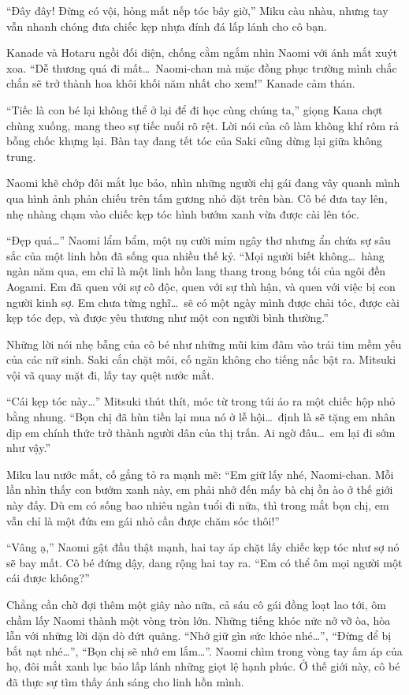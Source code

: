 \documentclass[../main.tex]{subfiles}
\begin{document}
``Đây đây! Đừng có vội, hỏng mất nếp tóc bây giờ,'' Miku càu nhàu, nhưng tay vẫn nhanh chóng đưa chiếc kẹp nhựa đính đá lấp lánh cho cô bạn.

Kanade và Hotaru ngồi đối diện, chống cằm ngắm nhìn Naomi với ánh mắt xuýt xoa. ``Dễ thương quá đi mất\dots\ Naomi-chan mà mặc đồng phục trường mình chắc chắn sẽ trở thành hoa khôi khối năm nhất cho xem!'' Kanade cảm thán.

``Tiếc là con bé lại không thể ở lại để đi học cùng chúng ta,'' giọng Kana chợt chùng xuống, mang theo sự tiếc nuối rõ rệt. Lời nói của cô làm không khí rôm rả bỗng chốc khựng lại. Bàn tay đang tết tóc của Saki cũng dừng lại giữa không trung.

Naomi khẽ chớp đôi mắt lục bảo, nhìn những người chị gái đang vây quanh mình qua hình ảnh phản chiếu trên tấm gương nhỏ đặt trên bàn. Cô bé đưa tay lên, nhẹ nhàng chạm vào chiếc kẹp tóc hình bướm xanh vừa được cài lên tóc.

``Đẹp quá\dots'' Naomi lẩm bẩm, một nụ cười mỉm ngây thơ nhưng ẩn chứa sự sâu sắc của một linh hồn đã sống qua nhiều thế kỷ. ``Mọi người biết không\dots\ hàng ngàn năm qua, em chỉ là một linh hồn lang thang trong bóng tối của ngôi đền Aogami. Em đã quen với sự cô độc, quen với sự thù hận, và quen với việc bị con người kinh sợ. Em chưa từng nghĩ\dots\ sẽ có một ngày mình được chải tóc, được cài kẹp tóc đẹp, và được yêu thương như một con người bình thường.''

Những lời nói nhẹ bẫng của cô bé như những mũi kim đâm vào trái tim mềm yếu của các nữ sinh. Saki cắn chặt môi, cố ngăn không cho tiếng nấc bật ra. Mitsuki vội vã quay mặt đi, lấy tay quệt nước mắt.

``Cái kẹp tóc này\dots'' Mitsuki thút thít, móc từ trong túi áo ra một chiếc hộp nhỏ bằng nhung. ``Bọn chị đã hùn tiền lại mua nó ở lễ hội\dots\ định là sẽ tặng em nhân dịp em chính thức trở thành người dân của thị trấn. Ai ngờ đâu\dots\ em lại đi sớm như vậy.''

Miku lau nước mắt, cố gắng tỏ ra mạnh mẽ: ``Em giữ lấy nhé, Naomi-chan. Mỗi lần nhìn thấy con bướm xanh này, em phải nhớ đến mấy bà chị ồn ào ở thế giới này đấy. Dù em có sống bao nhiêu ngàn tuổi đi nữa, thì trong mắt bọn chị, em vẫn chỉ là một đứa em gái nhỏ cần được chăm sóc thôi!''

``Vâng ạ,'' Naomi gật đầu thật mạnh, hai tay áp chặt lấy chiếc kẹp tóc như sợ nó sẽ bay mất. Cô bé đứng dậy, dang rộng hai tay ra. ``Em có thể ôm mọi người một cái được không?''

Chẳng cần chờ đợi thêm một giây nào nữa, cả sáu cô gái đồng loạt lao tới, ôm chầm lấy Naomi thành một vòng tròn lớn. Những tiếng khóc nức nở vỡ òa, hòa lẫn với những lời dặn dò đứt quãng. ``Nhớ giữ gìn sức khỏe nhé\dots'', ``Đừng để bị bắt nạt nhé\dots'', ``Bọn chị sẽ nhớ em lắm\dots''. Naomi chìm trong vòng tay ấm áp của họ, đôi mắt xanh lục bảo lấp lánh những giọt lệ hạnh phúc. Ở thế giới này, cô bé đã thực sự tìm thấy ánh sáng cho linh hồn mình.
\end{document}
